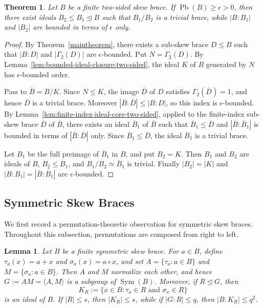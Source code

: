 \documentclass[10pt,a4paper]{amsart}
\numberwithin{equation}{section}
\newtheorem{lem}[equation]{Lemma}
\newtheorem{thm}[equation]{Theorem}
\newcommand{\Pb}{\operatorname{Pb} }
\begin{document}
\begin{thm}\label{thm:bfc-ideals-two-sided}
Let $B$ be a finite two-sided skew brace. If $\Pb(B)\geqslant\epsilon>0$, then there exist ideals $B_2\leqslant B_1\trianglelefteq B$ such that $B_1/B_2$ is a trivial brace, while $|B:B_1|$ and $|B_2|$ are bounded in terms of $\epsilon$ only.
\end{thm}
\begin{proof}
By Theorem~\ref{maintheorem}, there exists a sub-skew brace
$D\leqslant B$ such that $|B:D|$ and $|\Gamma_2(D)|$ are $\epsilon$-bounded. Put $N=\Gamma_2(D)$. By Lemma~\ref{lem:bounded-ideal-closure-two-sided}, the ideal $K$ of $B$ generated by $N$ has $\epsilon$-bounded order.

Pass to $\overline B=B/K$. Since $N\leqslant K$, the image $\overline D$ of $D$ satisfies $\Gamma_2(\overline D)= 1$, and hence $\overline D$ is a trivial brace. Moreover $|\overline B:\overline D| \leqslant |B:D|$, so this index is $\epsilon$-bounded. By Lemma~\ref{lem:finite-index-ideal-core-two-sided}, applied to the
finite-index sub-skew brace $\overline D$ of $\overline B$, there exists an
ideal $\overline B_1$ of $\overline B$ such that $\overline B_1\leqslant\overline D$
and $|\overline B:\overline B_1|$ is bounded in terms of
$|\overline B:\overline D|$ only. Since $\overline B_1\leqslant \overline D$, the ideal $\overline B_1$ is a trivial brace.

Let $B_1$ be the full preimage of $\overline B_1$ in $B$, and put $B_2=K$. Then $B_1$ and $B_2$ are ideals of $B$, $B_2\leqslant B_1$, and
$B_1/B_2\simeq\overline B_1$ is trivial. Finally $|B_2|=|K|$ and
$|B:B_1| = |\overline B:\overline B_1|$ are $\epsilon$-bounded.
\end{proof}

\subsection{Symmetric Skew Braces}

We first record a permutation-theoretic observation for symmetric skew braces. Throughout this subsection, permutations are composed from right to left.

\begin{lem}\label{lem:symmetric-permutation-bridge}
Let $B$ be a finite symmetric skew brace. For $a\in B$, define $\tau_a(x)=a+x$ and $\sigma_a(x)=a\circ x$, and set $A=\{\tau_a:a\in B\}$ and $M=\{\sigma_a:a\in B\}$. Then $A$ and $M$ normalize each other, and hence $G:=AM=\langle A,M\rangle$ is a subgroup of $\operatorname{Sym}(B)$. Moreover, if $R\unlhd G$, then
$$
K_R:=\{x\in B:\tau_x\in R\text{ and }\sigma_x\in R\}
$$
is an ideal of $B$. If $|R|\leqslant s$, then $|K_R|\leqslant s$, while if $|G:R|\leqslant q$, then $|B:K_R|\leqslant q^2$.
\end{lem}
\end{document}
